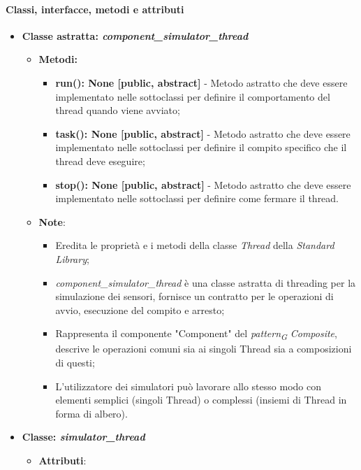 \paragraph{Classi, interfacce, metodi e attributi}

\begin{itemize}
    \item{\textbf{Classe astratta: \textit{component\_simulator\_thread}}}
    \begin{itemize}
        \item \textbf{Metodi:}
        \begin{itemize}
            \item \textbf{run(): None [public, abstract]} - Metodo astratto che deve essere implementato nelle sottoclassi per definire il comportamento del thread quando viene avviato;
            \item \textbf{task(): None [public, abstract]} - Metodo astratto che deve essere implementato nelle sottoclassi per definire il compito specifico che il thread deve eseguire;
            \item \textbf{stop(): None [public, abstract]} - Metodo astratto che deve essere implementato nelle sottoclassi per definire come fermare il thread.
        \end{itemize}
        \item\textbf{Note}:
        \begin{itemize}
            \item Eredita le proprietà e i metodi della classe \textit{Thread} della \textit{Standard Library};
            \item \textit{component\_simulator\_thread} è una classe astratta di threading per la simulazione dei sensori, fornisce un contratto per le operazioni di avvio, esecuzione del compito e arresto;
            \item Rappresenta il componente "Component" del \textit{pattern}\textsubscript{\textit{G}} \textit{Composite}, descrive le operazioni comuni sia ai singoli Thread sia a composizioni di questi;
            \item L'utilizzatore dei simulatori può lavorare allo stesso modo con elementi semplici (singoli Thread) o complessi (insiemi di Thread in forma di albero).
        \end{itemize}
    \end{itemize}
    \item{\textbf{Classe: \textit{simulator\_thread}}}
    \begin{itemize}
        \item\textbf{Attributi}:

\end{itemize}
\end{itemize}
